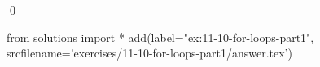 
\begin{ex}
  \label{ex:11-10-for-loops-part1}
  
  \qed
\end{ex}
\begin{python0}
from solutions import *
add(label="ex:11-10-for-loops-part1",
    srcfilename='exercises/11-10-for-loops-part1/answer.tex')
\end{python0}
